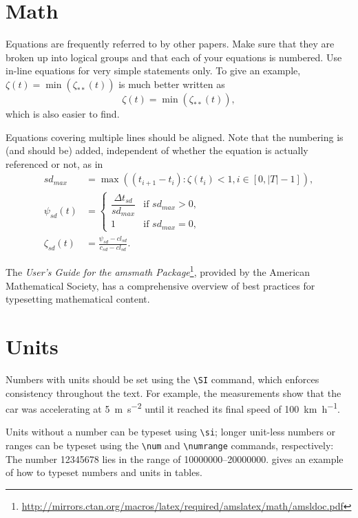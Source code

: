 \documentclass[]{ccs-thesis}
\begin{document}
\section{Math}

Equations are frequently referred to by other papers.
Make sure that they are broken up into logical groups and that each of your equations is numbered.
Use in-line equations for very simple statements only.
To give an example, $\zeta(t) = \min( \zeta_{**}(t))$ is much better written as
\begin{equation}\label{eq:zeta}
\zeta(t) =
	\min\left(
		\zeta_{**}(t)
	\right)
,
\end{equation}
which is also easier to find.

Equations covering multiple lines should be aligned.
Note that the numbering is (and should be) added, independent of whether the equation is actually referenced or not, as in
\begin{align}
sd_{max} &=
	\max\left(
		(t_{i+1} - t_i)
			: \zeta(t_i) < 1, i \in [0, |T|-1]
	\right)
,\\
\psi_{sd}(t) &=
	\begin{cases}
		\dfrac{\Delta t_{sd}}{sd_{max}}
			& \text{if $sd_{max} > 0$}, \\
		1
			& \text{if $sd_{max} = 0$},
	\end{cases}
\\
\zeta_{sd}(t) &= 
	\frac{
		\psi_{sd} - cl_{sd}
	}{
		c_{sd} - cl_{sd}
	}
.
\end{align}

The \emph{User's Guide for the amsmath Package}\footnote{\url{http://mirrors.ctan.org/macros/latex/required/amslatex/math/amsldoc.pdf}}, provided by the American Mathematical Society, has a comprehensive overview of best practices for typesetting mathematical content.


\clearpage
\section{Units}

Numbers with units should be set using the \verb|\SI| command, which enforces consistency throughout the text.
For example, the measurements show that the car was accelerating at \SI{5}{\metre\per\second\squared} until it reached its final speed of \SI{100}{\kilo\metre\per\hour}.

Units without a number can be typeset using \verb|\si|; longer unit-less numbers or ranges can be typeset using the \verb|\num| and \verb|\numrange| commands, respectively: The number \num{12345678} lies in the range of \numrange{10000000}{20000000}.
 gives an example of how to typeset numbers and units in tables.
\end{document}
